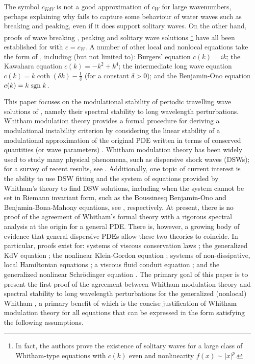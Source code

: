 \documentclass[11pt,leqno]{article}
\numberwithin{equation}{section}
\newcommand{\sign}{{\rm sgn }}
\theoremstyle{definition}
\begin{document}
The symbol $ c_{KdV} $ is not a good approximation of $ c_{W} $ for large wavenumbers, perhaps explaining why  fails to capture some behaviour of water waves such as breaking and peaking, even if it does support solitary waves. On the other hand, proofs of wave breaking \cite{Hur2017}, peaking \cite{EW2019} and solitary wave solutions \cite{EGW12}\footnote{In fact, the authors prove the existence of solitary waves for a large class of Whitham-type equations with $ c(k) $ even and nonlinearity $ f(x) \sim |x|^{p} $.} have all been established for  with $ c = c_{W} $. A number of other local and nonlocal equations take the form of , including (but not limited to): Burgers' equation $ c(k) = ik $; the Kawahara equation $ c(k) = -k^{2} + k^{4} $; the intermediate long wave equation $ c(k) = k \coth(\delta k) - \frac{1}{\delta} $ (for a constant $ \delta > 0 $); and the Benjamin-Ono equation $ c(k) = k\;\sign\; k $.

This paper focuses on the modulational stability of periodic travelling wave solutions of , namely their spectral stability to long wavelength perturbations. Whitham modulation theory provides a formal procedure for deriving a modulational instability criterion by considering the linear stability of a modulational approximation of the original PDE written in terms of conserved quantities (or wave parameters) \cite{Whitham1999,Whitham1970,W65}.  Whitham modulation theory has been widely used to study many physical phenomena, such as dispersive shock waves (DSWs); for a survey of recent results, see \cite{EH2016}.  Additionally, one topic of current interest is the ability to use DSW fitting and the system of equations provided by Whitham's theory to find DSW solutions, including when the system cannot be set in Riemann invariant form, such as the Boussinesq Benjamin-Ono and Benjamin-Bona-Mahony equations, see \cite{CEHS2021,NS2021}, respectively.
At present, there is no proof of the agreement of Whitham's formal theory with a rigorous spectral analysis at the origin for a general PDE. There is, however, a growing body of evidence that general dispersive PDEs allow these two theories to coincide. In particular, proofs exist for: systems of viscous conservation laws \cite{OZ2006,Serre05}; the generalized KdV equation \cite{JZ2010}; the nonlinear Klein-Gordon equation \cite{JMMP2014}; systems of non-dissipative, local Hamiltonian equations \cite{BNR14}; a viscous fluid conduit equation \cite{JP2020}; and the generalized nonlinear Schr{\"o}dinger equation \cite{CM2021}. The primary goal of this paper is to present the first proof of the agreement between Whitham modulation theory and spectral stability to long wavelength perturbations for the generalized (nonlocal) Whitham , a primary benefit of which is the concise justification of Whitham modulation theory for all equations that can be expressed in the form  satisfying the following assumptions. 
\end{document}
